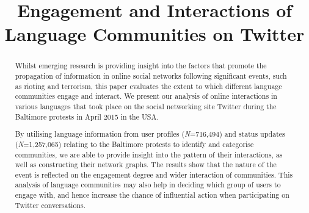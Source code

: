 \documentclass[conference]{IEEEtran}
\begin{document}
\title{Engagement and Interactions of Language Communities on Twitter}


\author{
\and
{}
\and
{}
}



\maketitle


\begin{abstract}
Whilst emerging research is providing insight into the factors that
promote the propagation of information in online social networks
following significant events, such as rioting and terrorism, this
paper evaluates the extent to which different language communities
engage and interact. We present our analysis of online interactions in
various languages that took place on the social networking site
Twitter during the Baltimore protests in April 2015 in the USA.

By utilising language information from user profiles
({\emph{N}}=716,494) and status updates ({\emph{N}}=1,257,065)
relating to the Baltimore protests to identify and categorise
communities, we are able to provide insight into the pattern of their
interactions, as well as constructing their network graphs. The
results show that the nature of the event is reflected on the
engagement degree and wider interaction of communities. This analysis
of language communities may also help in deciding which group of users
to engage with, and hence increase the chance of influential action
when participating on Twitter conversations.
\end{abstract}
\end{document}
